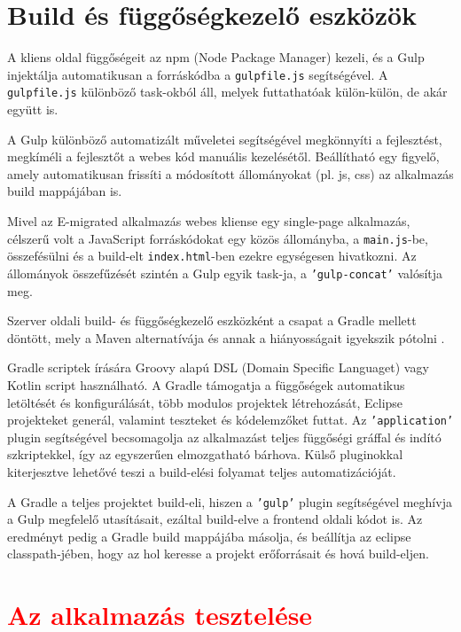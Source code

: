 \section{Build és függőségkezelő eszközök}
\label{subsec:gradle}
A kliens oldal függőségeit az npm (Node Package Manager) \cite{npm} kezeli, és a Gulp \cite{gulp} injektálja automatikusan a forráskódba a \texttt{gulpfile.js} segítségével. A \texttt{gulpfile.js} különböző task-okból áll, melyek futtathatóak külön-külön, de akár együtt is. 

A Gulp különböző automatizált műveletei segítségével megkönnyíti a fejlesztést, megkíméli a fejlesztőt a webes kód manuális kezelésétől. Beállítható egy figyelő, amely automatikusan frissíti a módosított állományokat (pl. js, css) az alkalmazás build mappájában is. 

Mivel az E-migrated alkalmazás webes kliense egy single-page alkalmazás, célszerű volt a JavaScript forráskódokat egy közös állományba, a \texttt{main.js}-be, összefésülni és a build-elt \texttt{index.html}-ben ezekre egységesen hivatkozni. Az állományok összefűzését szintén a Gulp egyik task-ja, a \texttt{'gulp-concat'} valósítja meg.  

Szerver oldali build- és függőségkezelő eszközként a csapat a Gradle mellett döntött, mely a Maven alternatívája és annak a hiányosságait igyekszik pótolni \cite{Gradle,GradleDoc}. 

Gradle scriptek írására Groovy alapú DSL (Domain Specific Languaget) vagy Kotlin script használható.  A Gradle támogatja a függőségek automatikus letöltését és konfigurálását, több modulos projektek létrehozását, Eclipse projekteket generál, valamint teszteket és kódelemzőket futtat. Az \texttt{'application'} plugin segítségével becsomagolja az alkalmazást teljes függőségi gráffal és indító szkriptekkel, így az egyszerűen elmozgatható bárhova. Külső pluginokkal kiterjesztve lehetővé teszi a build-elési folyamat teljes automatizációját. 

A Gradle a teljes projektet build-eli, hiszen a \texttt{'gulp'} plugin segítségével meghívja a Gulp megfelelő utasításait, ezáltal build-elve a frontend oldali kódot is. Az eredményt pedig a Gradle build mappájába másolja, és beállítja az eclipse classpath-jében, hogy az hol keresse a projekt erőforrásait és hová build-eljen. 

\section{\textcolor{red}{Az alkalmazás tesztelése}}
\label{sec:tesztek}

